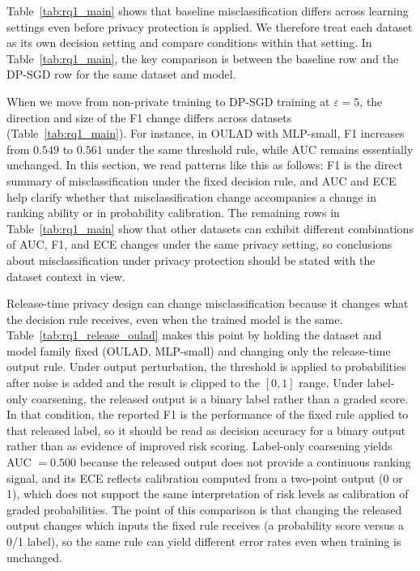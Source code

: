 \documentclass{edm_article}
\begin{document}
Table~\ref{tab:rq1_main} shows that baseline misclassification differs across learning settings even before privacy protection is applied. We therefore treat each dataset as its own decision setting and compare conditions within that setting. In Table~\ref{tab:rq1_main}, the key comparison is between the baseline row and the DP-SGD row for the same dataset and model.

When we move from non-private training to DP-SGD training at $\varepsilon=5$, the direction and size of the F1 change differs across datasets (Table~\ref{tab:rq1_main}). For instance, in OULAD with MLP-small, F1 increases from $0.549$ to $0.561$ under the same threshold rule, while AUC remains essentially unchanged. In this section, we read patterns like this as follows: F1 is the direct summary of misclassification under the fixed decision rule, and AUC and ECE help clarify whether that misclassification change accompanies a change in ranking ability or in probability calibration. The remaining rows in Table~\ref{tab:rq1_main} show that other datasets can exhibit different combinations of AUC, F1, and ECE changes under the same privacy setting, so conclusions about misclassification under privacy protection should be stated with the dataset context in view.

Release-time privacy design can change misclassification because it changes what the decision rule receives, even when the trained model is the same. Table~\ref{tab:rq1_release_oulad} makes this point by holding the dataset and model family fixed (OULAD, MLP-small) and changing only the release-time output rule. Under output perturbation, the threshold is applied to probabilities after noise is added and the result is clipped to the $[0,1]$ range. Under label-only coarsening, the released output is a binary label rather than a graded score. In that condition, the reported F1 is the performance of the fixed rule applied to that released label, so it should be read as decision accuracy for a binary output rather than as evidence of improved risk scoring. Label-only coarsening yields AUC $=0.500$ because the released output does not provide a continuous ranking signal, and its ECE reflects calibration computed from a two-point output (0 or 1), which does not support the same interpretation of risk levels as calibration of graded probabilities. The point of this comparison is that changing the released output changes which inputs the fixed rule receives (a probability score versus a 0/1 label), so the same rule can yield different error rates even when training is unchanged.
\end{document}
